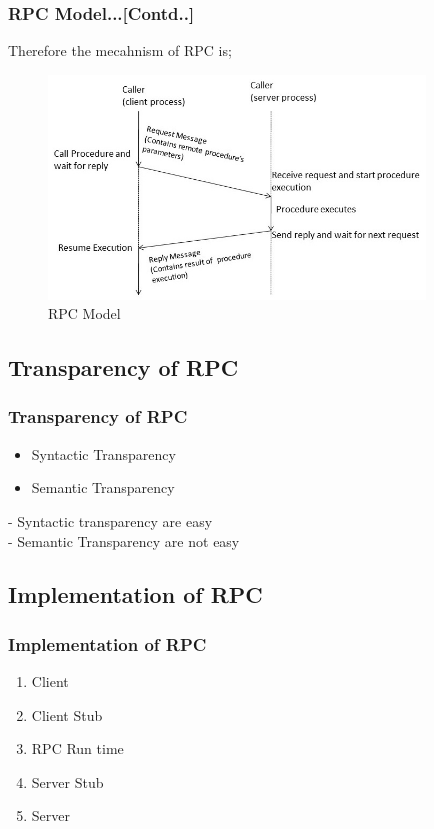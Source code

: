 \documentclass{beamer}
\begin{document}
\begin{frame}
	\frametitle{RPC Model...[Contd..]}
	 Therefore the mecahnism of RPC is;
	 \begin{figure}
	 	\centering
	 	\includegraphics[width=10cm]{fig41.jpg}
	 	\caption{RPC Model}
	 \end{figure}
\end{frame}

\subsection{Transparency of RPC}
\begin{frame}
	\frametitle{Transparency of RPC}
	\vspace{0.2cm}
	\begin{itemize}
		\item Syntactic Transparency
		\item Semantic Transparency
	\end{itemize}
	\vspace{0.5cm}
	- Syntactic transparency are easy\\
	- Semantic Transparency are not easy
	\vspace{3cm}
\end{frame}

\subsection{Implementation of RPC}
\begin{frame}
	\frametitle{Implementation of RPC}
	\vspace{0.5cm}
	\begin{enumerate}
		\item Client
		\item Client Stub
		\item RPC Run time
		\item Server Stub
		\item Server
	\end{enumerate}
	\vspace{3cm}
\end{frame}
\end{document}
